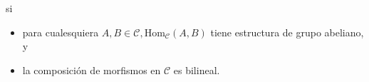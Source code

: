 \documentclass[preview]{standalone}
\begin{document}
\begin{center}
si \begin{itemize} \item para cualesquiera $A,B\in\mathscr{C}, \text{Hom}_\mathscr{C}(A,B)$ tiene estructura de grupo abeliano, y \item la composición de morfismos en $\mathscr{C}$ es bilineal.\end{itemize}
\end{center}
\end{document}
